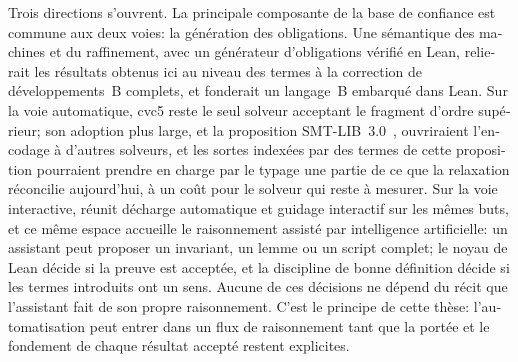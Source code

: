 \begin{otherlanguage}{french}
Trois directions s'ouvrent. La principale composante de la base de confiance
est commune aux deux voies: la génération des obligations. Une sémantique des
machines et du raffinement, avec un générateur d'obligations vérifié en Lean,
relierait les résultats obtenus ici au niveau des termes à la correction de
développements~B complets, et fonderait un langage~B embarqué dans Lean. Sur
la voie automatique, cvc5 reste le seul solveur acceptant le fragment d'ordre
supérieur; son adoption plus large, et la proposition
SMT-LIB~3.0~\cite{smtlib3proposal}, ouvriraient l'encodage à d'autres
solveurs, et les sortes indexées par des termes de cette proposition
pourraient prendre en charge par le typage une partie de ce que la relaxation
réconcilie aujourd'hui, à un coût pour le solveur qui reste à mesurer. Sur la
voie interactive, \barrel{} réunit décharge automatique et guidage interactif sur
les mêmes buts, et ce même espace accueille le raisonnement assisté par
intelligence artificielle: un assistant peut proposer un invariant, un lemme ou un script complet;
le noyau de Lean décide si la preuve est acceptée, et la discipline de bonne
définition décide si les termes introduits ont un sens. Aucune de ces
décisions ne dépend du récit que l'assistant fait de son propre raisonnement.
C'est le principe de cette thèse: l'automatisation peut entrer dans un flux
de raisonnement tant que la portée et le fondement de chaque résultat accepté
restent explicites.

\setcounter{figure}{0}
\tikzexternalenable
\endgroup
\end{otherlanguage}
